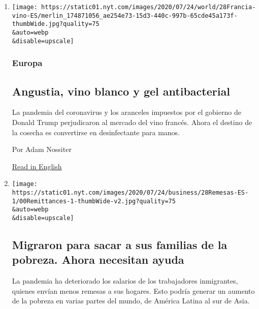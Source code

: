 \begin{enumerate}
\def\labelenumi{\arabic{enumi}.}
\item
  \href{/es/2020/07/28/espanol/mundo/vino-blanco-alsacia-coronavirus.html}{}

  \texttt{[image: https://static01.nyt.com/images/2020/07/24/world/28Francia-vino-ES/merlin\_174871056\_ae254e73-15d3-440c-997b-65cde45a173f-thumbWide.jpg?quality=75\\\&auto=webp\\\&disable=upscale]}

  \hypertarget{europa-2}{%
  \subsubsection{Europa}\label{europa-2}}

  \hypertarget{angustia-vino-blanco-y-gel-antibacterial}{%
  \subsection{Angustia, vino blanco y gel
  antibacterial}\label{angustia-vino-blanco-y-gel-antibacterial}}

  La pandemia del coronavirus y los aranceles impuestos por el gobierno
  de Donald Trump perjudicaron al mercado del vino francés. Ahora el
  destino de la cosecha es convertirse en desinfectante para manos.

  Por Adam Nossiter

  \href{https://www.nytimes.com/2020/07/27/world/europe/france-alsace-wine-coronavirus.html}{Read
  in English}
\item
  \href{/es/2020/07/28/espanol/mundo/remesas-coronavirus.html}{}

  \texttt{[image: https://static01.nyt.com/images/2020/07/24/business/28Remesas-ES-1/00Remittances-1-thumbWide-v2.jpg?quality=75\\\&auto=webp\\\&disable=upscale]}

  \hypertarget{migraron-para-sacar-a-sus-familias-de-la-pobreza-ahora-necesitan-ayuda}{%
  \subsection{Migraron para sacar a sus familias de la pobreza. Ahora
  necesitan
  ayuda}\label{migraron-para-sacar-a-sus-familias-de-la-pobreza-ahora-necesitan-ayuda}}

  La pandemia ha deteriorado los salarios de los trabajadores
  inmigrantes, quienes envían menos remesas a sus hogares. Esto podría
  generar un aumento de la pobreza en varias partes del mundo, de
  América Latina al sur de Asia.


\end{enumerate}
